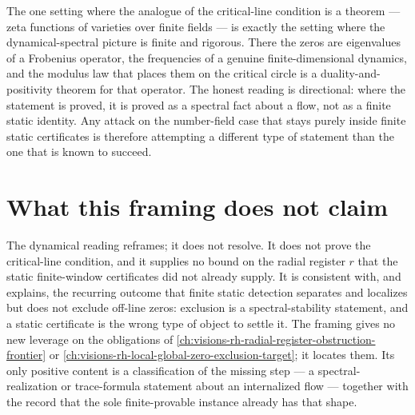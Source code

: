 \begin{principle}
\label{prin:ontology-kernel-function-field-instance}
The one setting where the analogue of the critical-line condition is a theorem
--- zeta functions of varieties over finite fields --- is exactly the setting
where the dynamical-spectral picture is finite and rigorous.  There the zeros
are eigenvalues of a Frobenius operator, the frequencies of a genuine
finite-dimensional dynamics, and the modulus law that places them on the
critical circle is a duality-and-positivity theorem for that operator.  The
honest reading is directional: where the statement is proved, it is proved as a
spectral fact about a flow, not as a finite static identity.  Any attack on the
number-field case that stays purely inside finite static certificates is
therefore attempting a different type of statement than the one that is known to
succeed.
\end{principle}

\section{What this framing does not claim}
\label{sec:ontology-kernel-dynamical-cannot-claim}

The dynamical reading reframes; it does not resolve.  It does not prove the
critical-line condition, and it supplies no bound on the radial register $r$
that the static finite-window certificates did not already supply.  It is
consistent with, and explains, the recurring outcome that finite static
detection separates and localizes but does not exclude off-line zeros: exclusion
is a spectral-stability statement, and a static certificate is the wrong type of
object to settle it.  The framing gives no new leverage on the obligations of
\autoref{ch:visions-rh-radial-register-obstruction-frontier} or
\autoref{ch:visions-rh-local-global-zero-exclusion-target}; it locates them.  Its
only positive content is a classification of the missing step --- a
spectral-realization or trace-formula statement about an internalized flow ---
together with the record that the sole finite-provable instance already has that
shape.
